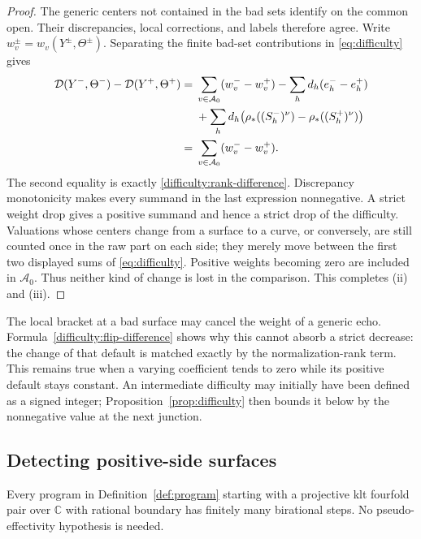 \begin{proof}
The generic centers not contained in the bad sets identify on the
common open.  Their discrepancies, local corrections, and labels
therefore agree.  Write \(w_v^\pm=w_v(Y^\pm,\Theta^\pm)\).
Separating the finite bad-set contributions in
\eqref{eq:difficulty} gives
\begin{align}
\label{difficulty:flip-difference}
 \mathcal D(Y^-,\Theta^-)-\mathcal D(Y^+,\Theta^+)
 ={}&\sum_{v\in\mathcal A_0}(w_v^- - w_v^+)
       -\sum_h d_h(e_h^- - e_h^+) \\
    &+\sum_h d_h
      \bigl(\rho_*((S_h^-)^\nu)-\rho_*((S_h^+)^\nu)\bigr)
 \notag\\
 ={}&\sum_{v\in\mathcal A_0}(w_v^- - w_v^+).
 \notag
\end{align}
The second equality is exactly
\eqref{difficulty:rank-difference}.  Discrepancy monotonicity makes
every summand in the last expression nonnegative.  A strict weight
drop gives a positive summand and hence a strict drop of the
difficulty.  Valuations whose centers change from a surface to a
curve, or conversely, are still counted once in the raw part on each
side; they merely move between the first two displayed sums of
\eqref{eq:difficulty}.  Positive weights becoming zero are included
in \(\mathcal A_0\).  Thus neither kind of change is lost in the
comparison.  This completes (ii) and (iii).
\end{proof}

\begin{remark}
The local bracket at a bad surface may cancel the weight of a
generic echo.  Formula~\eqref{difficulty:flip-difference} shows why
this cannot absorb a strict decrease: the change of that default is
matched exactly by the normalization-rank term.  This remains true
when a varying coefficient tends to zero while its positive default
stays constant.  An intermediate difficulty may initially have been
defined as a signed integer; Proposition~\ref{prop:difficulty}
then bounds it below by the nonnegative value at the next junction.
\end{remark}

\subsection{Detecting positive-side surfaces}

\begin{theorem}
\label{thm:klt-termination}
Every program in Definition~\ref{def:program} starting with a
projective klt fourfold pair over \(\mathbb C\) with rational boundary has finitely
many birational steps.  No pseudo-effectivity hypothesis is needed.
\end{theorem}

